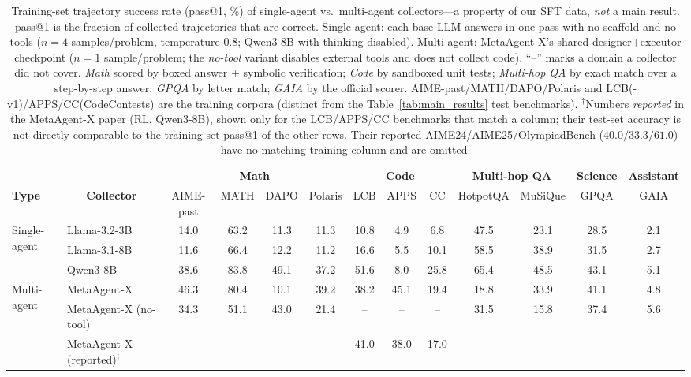 \documentclass{article} %
\begin{document}
\begin{table}[t]
\centering
\small
\begin{adjustbox}{max width=\textwidth}
\begin{tabular}{ll|cccc|ccc|cc|c|c}
\toprule
 & & \multicolumn{4}{c|}{\textbf{Math}} & \multicolumn{3}{c|}{\textbf{Code}} & \multicolumn{2}{c|}{\textbf{Multi-hop QA}} & \textbf{Science} & \textbf{Assistant} \\
\cmidrule(lr){3-6}\cmidrule(lr){7-9}\cmidrule(lr){10-11}\cmidrule(lr){12-12}\cmidrule(lr){13-13}
\textbf{Type} & \multicolumn{1}{c|}{\textbf{Collector}} & AIME-past & MATH & DAPO & Polaris & LCB & APPS & CC & HotpotQA & MuSiQue & GPQA & GAIA \\
\midrule
\multirow{3}{*}{Single-agent}
 & Llama-3.2-3B & 14.0 & 63.2 & 11.3 & 11.3 & 10.8 & 4.9 & 6.8 & 47.5 & 23.1 & 28.5 & 2.1 \\
 & Llama-3.1-8B & 11.6 & 66.4 & 12.2 & 11.2 & 16.6 & 5.5 & 10.1 & 58.5 & 38.9 & 31.5 & 2.7 \\
 & Qwen3-8B & 38.6 & 83.8 & 49.1 & 37.2 & 51.6 & 8.0 & 25.8 & 65.4 & 48.5 & 43.1 & 5.1 \\
\midrule
\multirow{3}{*}{Multi-agent}
 & MetaAgent-X~\citep{zhang2026metaagentx} & 46.3 & 80.4 & 10.1 & 39.2 & 38.2 & 45.1 & 19.4 & 18.8 & 33.9 & 41.1 & 4.8 \\
 & MetaAgent-X (no-tool)~\citep{zhang2026metaagentx} & 34.3 & 51.1 & 43.0 & 21.4 & -- & -- & -- & 31.5 & 15.8 & 37.4 & 5.6 \\
 & MetaAgent-X (reported)$^\dagger$~\citep{zhang2026metaagentx} & -- & -- & -- & -- & 41.0 & 38.0 & 17.0 & -- & -- & -- & -- \\
\bottomrule
\end{tabular}
\end{adjustbox}
\caption{Training-set trajectory success rate (pass@1, \%) of single-agent vs.\ multi-agent
collectors---a property of our SFT data, \emph{not} a main result. pass@1 is the fraction of
collected trajectories that are correct. Single-agent: each base LLM answers in one pass with no
scaffold and no tools ($n{=}4$ samples/problem, temperature $0.8$; Qwen3-8B with thinking
disabled). Multi-agent: MetaAgent-X's
shared designer+executor checkpoint ($n{=}1$ sample/problem; the \emph{no-tool} variant disables
external tools and does not collect code). ``--'' marks a domain a collector did not cover.
\emph{Math} scored by boxed answer + symbolic verification; \emph{Code} by sandboxed unit tests;
\emph{Multi-hop QA} by exact match over a step-by-step answer; \emph{GPQA} by letter match;
\emph{GAIA} by the official scorer. AIME-past/MATH/DAPO/Polaris and LCB(-v1)/APPS/CC(CodeContests)
are the training corpora (distinct from the Table~\ref{tab:main_results} test benchmarks).
$^\dagger$Numbers \emph{reported} in the MetaAgent-X paper (RL, Qwen3-8B), shown only for the
LCB/APPS/CC benchmarks that match a column; their test-set accuracy is not directly comparable to
the training-set pass@1 of the other rows. Their reported AIME24/AIME25/OlympiadBench
($40.0/33.3/61.0$) have no matching training column and are omitted.}
\label{tab:sft_data_success}
\end{table}
\end{document}
